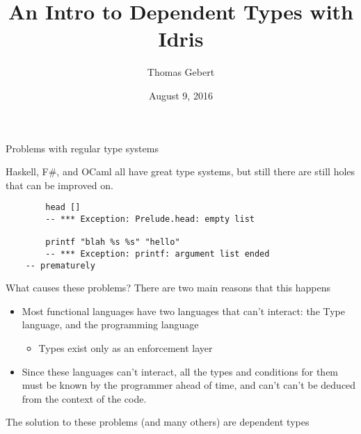 \documentclass{beamer}
\title{An Intro to Dependent Types with Idris}
\subtitle{}
\author{Thomas Gebert}
\date{August 9, 2016}
\begin{document}
  \frame{\titlepage}
\begin{frame}[fragile]{Problems with regular type systems}
	
 	\transdissolve
	Haskell, F\#, and OCaml all have great type systems, but still there are still holes that can be improved on.
	\pause
	\begin{lstlisting}
		head []
		-- *** Exception: Prelude.head: empty list

		printf "blah %s %s" "hello"
		-- *** Exception: printf: argument list ended 
    -- prematurely
	\end{lstlisting}

\end{frame}
  \begin{frame}{What causes these problems?}
 		\transdissolve
	There are two main reasons that this happens
	  \begin{itemize}
		\pause
		\item Most functional languages have two languages that can't interact: the Type language, and the programming language \begin{itemize}
			\pause
			\item Types exist only as an enforcement layer
			\end{itemize}
		\pause
		\item Since these languages can't interact, all the types and conditions for them must be known by the programmer ahead of time, and can't can't be deduced from the context of the code.
	  \end{itemize}
  \end{frame}
\begin{frame}
\begin{center}
 		\transdissolve
 The solution to these problems (and many others) are dependent types
\end{center}
\end{frame}
\end{document}
